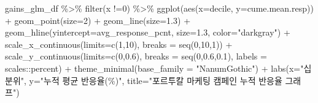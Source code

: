 \documentclass[
  letterpaper,
  chapter,a4paper,showtrims,openright,hidelinks]{oblivoir}
\newenvironment{Shaded}{\begin{snugshade}}{\end{snugshade}}
\newcommand{\AttributeTok}[1]{\textcolor[rgb]{0.40,0.45,0.13}{#1}}
\newcommand{\DecValTok}[1]{\textcolor[rgb]{0.68,0.00,0.00}{#1}}
\newcommand{\FloatTok}[1]{\textcolor[rgb]{0.68,0.00,0.00}{#1}}
\newcommand{\FunctionTok}[1]{\textcolor[rgb]{0.28,0.35,0.67}{#1}}
\newcommand{\NormalTok}[1]{\textcolor[rgb]{0.00,0.23,0.31}{#1}}
\newcommand{\SpecialCharTok}[1]{\textcolor[rgb]{0.37,0.37,0.37}{#1}}
\newcommand{\StringTok}[1]{\textcolor[rgb]{0.13,0.47,0.30}{#1}}
\begin{document}
\begin{Shaded}
\begin{Highlighting}[]
\NormalTok{gains\_glm\_df }\SpecialCharTok{\%\textgreater{}\%} 
    \FunctionTok{filter}\NormalTok{(x }\SpecialCharTok{!=}\DecValTok{0}\NormalTok{) }\SpecialCharTok{\%\textgreater{}\%} 
    \FunctionTok{ggplot}\NormalTok{(}\FunctionTok{aes}\NormalTok{(}\AttributeTok{x=}\NormalTok{decile, }\AttributeTok{y=}\NormalTok{cume.mean.resp)) }\SpecialCharTok{+}
      \FunctionTok{geom\_point}\NormalTok{(}\AttributeTok{size=}\DecValTok{2}\NormalTok{) }\SpecialCharTok{+}
      \FunctionTok{geom\_line}\NormalTok{(}\AttributeTok{size=}\FloatTok{1.3}\NormalTok{) }\SpecialCharTok{+}
      \FunctionTok{geom\_hline}\NormalTok{(}\AttributeTok{yintercept=}\NormalTok{avg\_response\_pcnt, }\AttributeTok{size=}\FloatTok{1.3}\NormalTok{, }\AttributeTok{color=}\StringTok{"darkgray"}\NormalTok{) }\SpecialCharTok{+}
      \FunctionTok{scale\_x\_continuous}\NormalTok{(}\AttributeTok{limits=}\FunctionTok{c}\NormalTok{(}\DecValTok{1}\NormalTok{,}\DecValTok{10}\NormalTok{), }\AttributeTok{breaks =} \FunctionTok{seq}\NormalTok{(}\DecValTok{0}\NormalTok{,}\DecValTok{10}\NormalTok{,}\DecValTok{1}\NormalTok{)) }\SpecialCharTok{+}
      \FunctionTok{scale\_y\_continuous}\NormalTok{(}\AttributeTok{limits=}\FunctionTok{c}\NormalTok{(}\DecValTok{0}\NormalTok{,}\FloatTok{0.6}\NormalTok{), }\AttributeTok{breaks =} \FunctionTok{seq}\NormalTok{(}\DecValTok{0}\NormalTok{,}\FloatTok{0.6}\NormalTok{,}\FloatTok{0.1}\NormalTok{), }\AttributeTok{labels =}\NormalTok{ scales}\SpecialCharTok{::}\NormalTok{percent) }\SpecialCharTok{+}
      \FunctionTok{theme\_minimal}\NormalTok{(}\AttributeTok{base\_family =} \StringTok{"NanumGothic"}\NormalTok{) }\SpecialCharTok{+}
      \FunctionTok{labs}\NormalTok{(}\AttributeTok{x=}\StringTok{"십분위"}\NormalTok{, }\AttributeTok{y=}\StringTok{"누적 평균 반응율(\%)"}\NormalTok{, }\AttributeTok{title=}\StringTok{"포르투칼 마케팅 캠페인 누적 반응율 그래프"}\NormalTok{) }
\end{Highlighting}
\end{Shaded}
\end{document}
